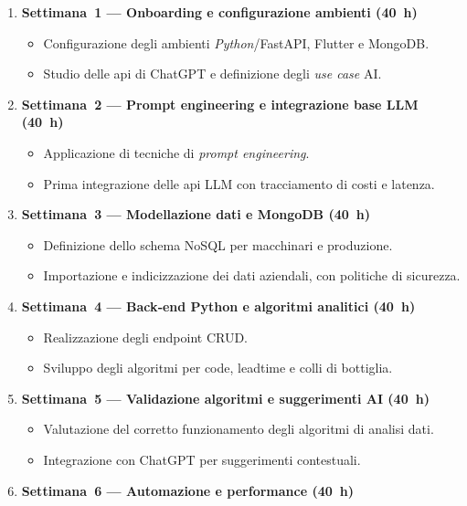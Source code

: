 \begin{enumerate}
    \item \textbf{Settimana~1 — Onboarding e configurazione ambienti (40~h)}
        \begin{itemize}
            \item Configurazione degli ambienti \textit{Python}/FastAPI, Flutter e MongoDB.
            \item Studio delle \gls{api} di ChatGPT e definizione degli \textit{use case} AI.
        \end{itemize}
    \item \textbf{Settimana~2 — Prompt engineering e integrazione base LLM (40~h)}
        \begin{itemize}
            \item Applicazione di tecniche di \textit{prompt engineering}.
            \item Prima integrazione delle \gls{api} LLM con tracciamento di costi e latenza.
        \end{itemize}
    \item \textbf{Settimana~3 — Modellazione dati e MongoDB (40~h)}
        \begin{itemize}
            \item Definizione dello schema NoSQL per macchinari e produzione.
            \item Importazione e indicizzazione dei dati aziendali, con politiche di sicurezza.
        \end{itemize}
    \item \textbf{Settimana~4 — Back‑end Python e algoritmi analitici (40~h)}
        \begin{itemize}
            \item Realizzazione degli endpoint CRUD.
            \item Sviluppo degli algoritmi per code, \gls{leadtime} e colli di bottiglia.
        \end{itemize}
    \item \textbf{Settimana~5 — Validazione algoritmi e suggerimenti AI (40~h)}
        \begin{itemize}
            \item Valutazione del corretto funzionamento degli algoritmi di analisi dati.
            \item Integrazione con ChatGPT per suggerimenti contestuali.
        \end{itemize}
    \item \textbf{Settimana~6 — Automazione e performance (40~h)}

\end{enumerate}
